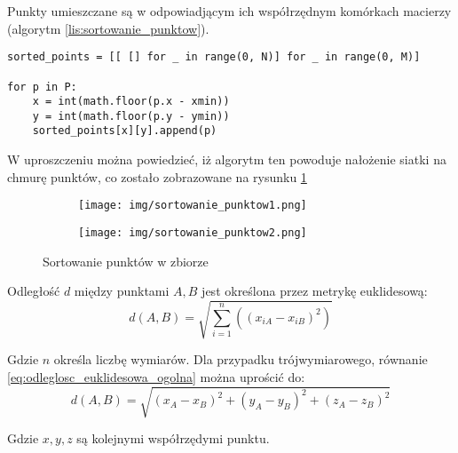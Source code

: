 \noindent Punkty umieszczane są w odpowiadjącym ich współrzędnym komórkach macierzy (algorytm \ref{lis:sortowanie_punktow}).

\begin{lstlisting}[frame=Lm language=python, caption={Sortowanie punktów}, label={lis:sortowanie_punktow}]
sorted_points = [[ [] for _ in range(0, N)] for _ in range(0, M)]

for p in P:
    x = int(math.floor(p.x - xmin))
    y = int(math.floor(p.y - ymin))
    sorted_points[x][y].append(p)

\end{lstlisting}

W uproszczeniu można powiedzieć, iż algorytm ten powoduje nałożenie siatki na chmurę punktów, co zostało zobrazowane na rysunku \ref{fig:sortowanie_punktow}

\begin{figure}[h!]
	\centering
    \begin{subfigure}[b]{0.3\textwidth}
        \texttt{[image: img/sortowanie\_punktow1.png]}
    \end{subfigure}%
    \begin{subfigure}[b]{0.3\textwidth}
        \texttt{[image: img/sortowanie\_punktow2.png]}
    \end{subfigure}%
    \caption{Sortowanie punktów w zbiorze}
    \label{fig:sortowanie_punktow}
\end{figure}


\noindent Odległość $d$ między punktami $A, B$ jest określona przez metrykę euklidesową:
\begin{equation} \label{eq:odleglosc_euklidesowa_ogolna}
    d(A,B) = \sqrt{\sum\limits_{i=1}^n((x_{iA}-x_{iB})^2)}
\end{equation}

\noindent Gdzie $n$ określa liczbę wymiarów. Dla przypadku trójwymiarowego, równanie \ref{eq:odleglosc_euklidesowa_ogolna} można uprościć do:
\begin{equation} \label{eq:odleglosc_euklidesowa}
    d(A,B) = \sqrt{(x_A - x_B)^2 + (y_A - y_B)^2 + (z_A - z_B)^2}
\end{equation}

\noindent Gdzie $x, y, z$ są kolejnymi współrzędymi punktu.


